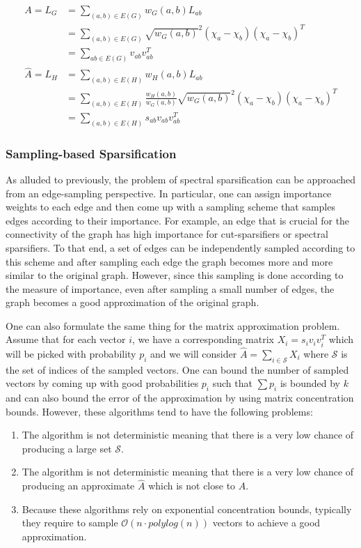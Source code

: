 \documentclass[
  letterpaper,
  DIV=11,
  numbers=noendperiod]{scrartcl}
\providecommand{\tightlist}{%
  \setlength{\itemsep}{0pt}\setlength{\parskip}{0pt}}\usepackage{longtable,booktabs,array}
\theoremstyle{plain}
\theoremstyle{plain}
\theoremstyle{plain}
\theoremstyle{definition}
\theoremstyle{remark}
\begin{document}
\begin{align*}
A = L_G &= \sum_{(a,b) \in E(G)} w_G(a,b) L_{ab} \\
&= \sum_{(a,b) \in E(G)} \sqrt{w_G(a,b)}^2 (\chi_a - \chi_b) (\chi_a - \chi_b)^T\\
& = \sum_{ab \in E(G)} v_{ab} v_{ab}^T\\
\hat{A} = L_H &= \sum_{(a, b) \in E(H)} w_H(a,b) L_{ab} \\
&= \sum_{(a, b) \in E(H)} \frac{w_H(a,b)}{w_G(a,b)} \sqrt{w_G(a,b)}^2 (\chi_a - \chi_b) (\chi_a - \chi_b)^T\\
&= \sum_{(a,b) \in E(H)} s_{ab} v_{ab} v_{ab}^T
\end{align*}

\hypertarget{sampling-based-sparsification}{%
\subsubsection{Sampling-based
Sparsification}\label{sampling-based-sparsification}}

As alluded to previously, the problem of spectral sparsification can be
approached from an edge-sampling perspective. In particular, one can
assign importance weights to each edge and then come up with a sampling
scheme that samples edges according to their importance. For example, an
edge that is crucial for the connectivity of the graph has high
importance for cut-sparsifiers or spectral sparsifiers. To that end, a
set of edges can be independently sampled according to this scheme and
after sampling each edge the graph becomes more and more similar to the
original graph. However, since this sampling is done according to the
measure of importance, even after sampling a small number of edges, the
graph becomes a good approximation of the original graph.

One can also formulate the same thing for the matrix approximation
problem. Assume that for each vector \(i\), we have a corresponding
matrix \(X_i = s_i v_i v_i^T\) which will be picked with probability
\(p_i\) and we will consider \(\hat{A} = \sum_{i \in \mathcal{S}} X_i\)
where \(\mathcal{S}\) is the set of indices of the sampled vectors. One
can bound the number of sampled vectors by coming up with good
probabilities \(p_i\) such that \(\sum p_i\) is bounded by \(k\) and can
also bound the error of the approximation by using matrix concentration
bounds. However, these algorithms tend to have the following problems:

\begin{enumerate}
\def\labelenumi{\arabic{enumi}.}
\tightlist
\item
  The algorithm is not deterministic meaning that there is a very low
  chance of producing a large set \(\mathcal{S}\).
\item
  The algorithm is not deterministic meaning that there is a very low
  chance of producing an approximate \(\hat{A}\) which is not close to
  \(A\).
\item
  Because these algorithms rely on exponential concentration bounds,
  typically they require to sample \(\mathcal{O}(n \cdot polylog(n))\)
  vectors to achieve a good approximation.
\end{enumerate}
\end{document}
